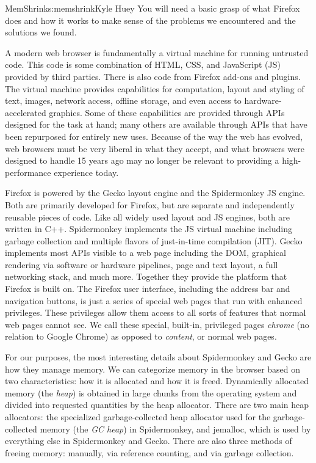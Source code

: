 \begin{aosachapter}{MemShrink}{s:memshrink}{Kyle Huey}
You will need a basic grasp of what Firefox does and how it works to
make sense of the problems we encountered and the solutions we found.

A modern web browser is fundamentally a virtual machine for running
untrusted code. This code is some combination of HTML, CSS, and
JavaScript (JS) provided by third parties. There is also code from
Firefox add-ons and plugins. The virtual machine provides capabilities
for computation, layout and styling of text, images, network access,
offline storage, and even access to hardware-accelerated graphics. Some
of these capabilities are provided through APIs designed for the task at
hand; many others are available through APIs that have been repurposed
for entirely new uses. Because of the way the web has evolved, web
browsers must be very liberal in what they accept, and what browsers
were designed to handle 15 years ago may no longer be relevant to
providing a high-performance experience today.

Firefox is powered by the Gecko layout engine and the Spidermonkey JS
engine. Both are primarily developed for Firefox, but are separate and
independently reusable pieces of code. Like all widely used layout and
JS engines, both are written in C++. Spidermonkey implements the JS
virtual machine including garbage collection and multiple flavors of
just-in-time compilation (JIT). Gecko implements most APIs visible to a
web page including the DOM, graphical rendering via software or hardware
pipelines, page and text layout, a full networking stack, and much more.
Together they provide the platform that Firefox is built on. The Firefox
user interface, including the address bar and navigation buttons, is
just a series of special web pages that run with enhanced privileges.
These privileges allow them access to all sorts of features that normal
web pages cannot see. We call these special, built-in, privileged pages
\emph{chrome} (no relation to Google Chrome) as opposed to
\emph{content}, or normal web pages.

For our purposes, the most interesting details about Spidermonkey and
Gecko are how they manage memory. We can categorize memory in the
browser based on two characteristics: how it is allocated and how it is
freed. Dynamically allocated memory (the \emph{heap}) is obtained in
large chunks from the operating system and divided into requested
quantities by the heap allocator. There are two main heap allocators:
the specialized garbage-collected heap allocator used for the
garbage-collected memory (the \emph{GC heap}) in Spidermonkey, and
jemalloc, which is used by everything else in Spidermonkey and Gecko.
There are also three methods of freeing memory: manually, via reference
counting, and via garbage collection.


\end{aosachapter}

